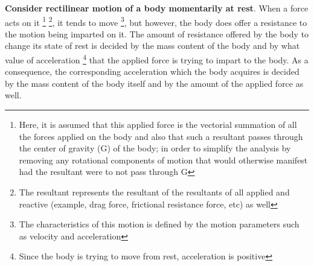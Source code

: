 \textbf{Consider rectilinear motion of a body momentarily at rest}. When a force acts on it \footnote{Here, it is assumed that this applied force is the vectorial summation of all the forces applied on the body and also that such a resultant passes through the center of gravity (G) of the body; in order to simplify the analysis by removing any rotational components of motion that would otherwise manifest had the resultant were to not pass through G} \footnote{The resultant represents the resultant of the resultants of all applied and reactive (example, drag force, frictional resistance force, etc) as well}, it tends to move \footnote{The characteristics of this motion is defined by the motion parameters such as velocity and acceleration}, but however, the body does offer a resistance to the motion being imparted on it. The amount of resistance offered by the body to change its state of rest is decided by the mass content of the body and by what value of acceleration \footnote{Since the body is trying to move from rest, acceleration is positive} that the applied force is trying to impart to the body. As a consequence, the corresponding acceleration which the body acquires is decided by the mass content of the body itself and by the amount of the applied force as well. 

